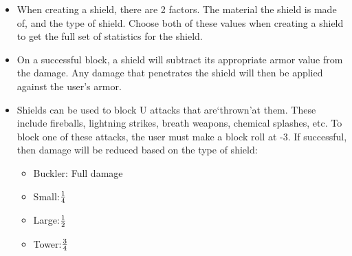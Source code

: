 \documentclass[twoside]{book}
\begin{document}
\begin{itemize}
      
  \item When creating a shield, there are 2 factors. The material the shield is made of, and the type of shield. Choose both of these values when creating a shield to get the full set of statistics for the shield.
  \item On a successful block, a shield will subtract its appropriate armor value from the damage. Any damage that penetrates the shield will then be applied against the user's armor.
  \item Shields can be used to block U attacks that are`thrown'at them. These include fireballs, lightning strikes, breath weapons, chemical splashes, etc. To block one of these attacks, the user must make a block roll at -3. If successful, then damage will be reduced based on the type of shield:
\begin{itemize}
      
  \item Buckler: Full damage
  \item Small:\begin{math}{{1}\over{4}}\end{math}
  \item Large:\begin{math}{{1}\over{2}}\end{math}
  \item Tower:\begin{math}{{3}\over{4}}\end{math}
\end{itemize}
  
\end{itemize}
  
\end{document}
